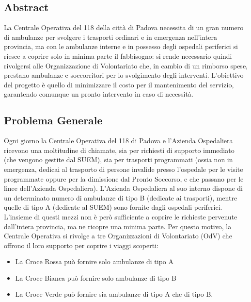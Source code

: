 \subsection{Abstract}
La Centrale Operativa del 118 della città di Padova necessita di un gran numero di ambulanze per svolgere i trasporti ordinari e in emergenza nell’intera provincia, ma con le ambulanze interne e in possesso degli ospedali periferici si riesce a coprire solo in minima parte il fabbisogno: si rende necessario quindi rivolgersi alle Organizzazione di Volontariato che, in cambio di un rimborso spese, prestano ambulanze e soccorritori per lo svolgimento degli interventi. 
L’obiettivo del progetto è quello di minimizzare il costo per il mantenimento del servizio, garantendo comunque un pronto intervento in caso di necessità. 

\subsection{Problema Generale}
Ogni giorno la Centrale Operativa del 118 di Padova e l'Azienda Ospedaliera ricevono una moltitudine di chiamate, sia per richiesti di supporto immediato (che vengono gestite dal SUEM), sia per trasporti programmati (ossia non in emergenza, dedicai al trasporto di persone invalide presso l'ospedale per le visite programmate oppure per la dimissione dal Pronto Soccorso, e che passano per le linee dell'Azienda Ospedaliera).
\newline \newline
L'Azienda Ospedaliera al suo interno dispone di un determinato numero di ambulanze di tipo B (dedicate ai trasporti), mentre quelle di tipo A (dedicate al SUEM) sono fornite dagli ospedali periferici. L'insieme di questi mezzi non è però sufficiente a coprire le richieste pervenute dall'intera provincia, ma ne ricopre una minima parte. Per questo motivo, la Centrale Operativa si rivolge a tre Organizzazioni di Volontariato (OdV) che offrono il loro supporto per coprire i viaggi scoperti:
\begin{itemize}
    \item La Croce Rossa può fornire solo ambulanze di tipo A
    \item La Croce Bianca può fornire solo ambulanze di tipo B
    \item La Croce Verde può fornire sia ambulanze di tipo A che di tipo B.
\end{itemize}

